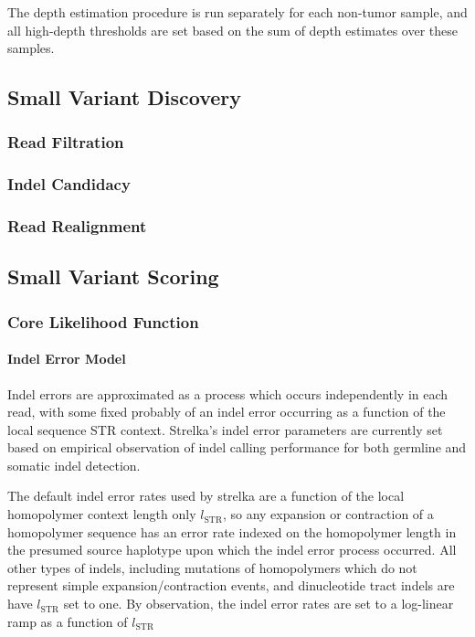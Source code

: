 \documentclass{article}
\begin{document}
The depth estimation procedure is run separately for each non-tumor sample, and all high-depth thresholds are set based on the sum of depth estimates over these samples.

\subsection{Small Variant Discovery}

\subsubsection{Read Filtration}

\subsubsection{Indel Candidacy}

\subsubsection{Read Realignment}

\subsection{Small Variant Scoring}

\subsubsection{Core Likelihood Function}

\paragraph{Indel Error Model}

Indel errors are approximated as a process which occurs independently in each read, with some fixed probably of an indel error occurring as a function of the local sequence STR context. Strelka's indel error parameters are currently set based on empirical observation of indel calling performance for both germline and somatic indel detection.

The default indel error rates used by strelka are a function of the local homopolymer context length only $l_{\text{STR}}$, so any expansion or contraction of a homopolymer sequence has an error rate indexed on the homopolymer length in the presumed source haplotype upon which the indel error process occurred. All other types of indels, including mutations of homopolymers which do not represent simple expansion/contraction events, and dinucleotide tract indels are have $l_{\text{STR}}$ set to one. By observation, the indel error rates are set to a log-linear ramp as a function of $l_{\text{STR}}$
\end{document}
